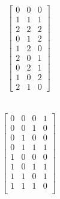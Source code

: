 \documentclass[11pt]{article}
\begin{document}
\section{} %
\subsection{} %
\begin{align*}
	\begin{bmatrix}
		0 & 0 & 0\\
		1 & 1 & 1\\
		2 & 2 & 2\\
		0 & 1 & 2\\
		1 & 2 & 0\\
		2 & 0 & 1\\
		0 & 2 & 1\\
		1 & 0 & 2\\
		2 & 1 & 0
	\end{bmatrix}
\end{align*}


\subsection{} %
\begin{align*}
	\begin{bmatrix}
		0 & 0 & 0 & 1\\
		0 & 0 & 1 & 0\\
		0 & 1 & 0 & 0\\
		0 & 1 & 1 & 1\\
		1 & 0 & 0 & 0\\
		1 & 0 & 1 & 1\\
		1 & 1 & 0 & 1\\
		1 & 1 & 1 & 0\\
	\end{bmatrix}
\end{align*}
\end{document}
